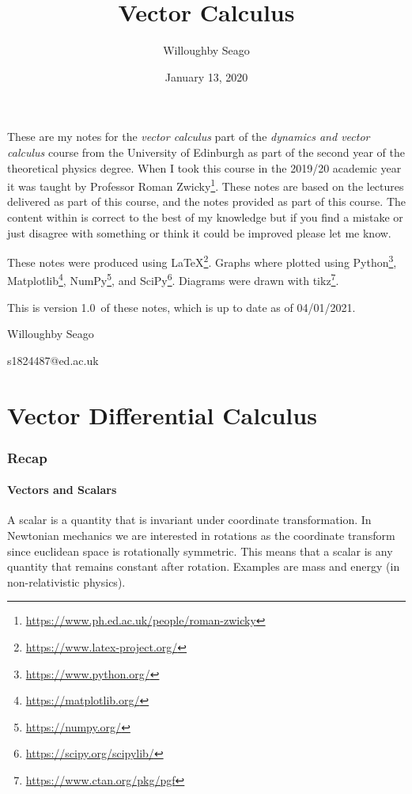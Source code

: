 \documentclass{article}
\author{Willoughby Seago}
\date{January 13, 2020}
\title{Vector Calculus}
\newcommand{\notesVersion}{1.0}
\newcommand{\notesDate}{04/01/2021}
\begin{document}
    \maketitle
    These are my notes for the \textit{vector calculus} part of the \textit{dynamics and vector calculus} course from the University of Edinburgh as part of the second year of the theoretical physics degree.
    When I took this course in the 2019/20 academic year it was taught by Professor Roman Zwicky\footnote{\url{https://www.ph.ed.ac.uk/people/roman-zwicky}}.
    These notes are based on the lectures delivered as part of this course, and the notes provided as part of this course.
    The content within is correct to the best of my knowledge but if you find a mistake or just disagree with something or think it could be improved please let me know.
    
    These notes were produced using \LaTeX\footnote{\url{https://www.latex-project.org/}}.
    Graphs where plotted using Python\footnote{\url{https://www.python.org/}}, Matplotlib\footnote{\url{https://matplotlib.org/}}, NumPy\footnote{\url{https://numpy.org/}}, and SciPy\footnote{\url{https://scipy.org/scipylib/}}.
    Diagrams were drawn with tikz\footnote{\url{https://www.ctan.org/pkg/pgf}}.
    
    This is version \notesVersion~of these notes, which is up to date as of \notesDate.
    \begin{flushright}
        Willoughby Seago
        
        s1824487@ed.ac.uk
    \end{flushright}
    \clearpage
    \tableofcontents
    \listoffigures
    \clearpage
    
    \part{Vector Differential Calculus}
    \section{Recap}
    \subsection{Vectors and Scalars}
    A scalar is a quantity that is invariant under coordinate transformation. 
    In Newtonian mechanics we are interested in rotations as the coordinate transform since euclidean space is rotationally symmetric.
    This means that a scalar is any quantity that remains constant after rotation.
    Examples are mass and energy (in non-relativistic physics).
    
\end{document}
